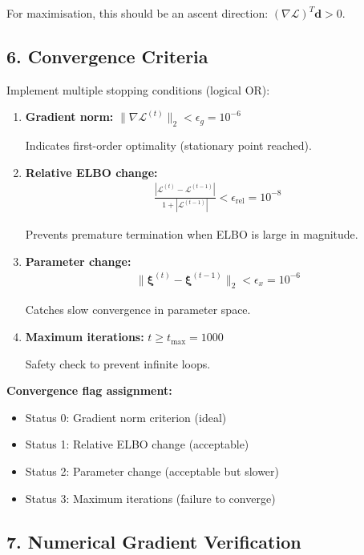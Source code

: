 \documentclass[11pt]{article}
\begin{document}
For maximisation, this should be an ascent direction: $(\nabla \mathcal{L})^T \bm{d} > 0$.

\subsection*{6. Convergence Criteria}

Implement multiple stopping conditions (logical OR):

\begin{enumerate}
\item \textbf{Gradient norm:} $\|\nabla \mathcal{L}^{(t)}\|_2 < \epsilon_g = 10^{-6}$

Indicates first-order optimality (stationary point reached).

\item \textbf{Relative ELBO change:}
\begin{align}
\frac{|\mathcal{L}^{(t)} - \mathcal{L}^{(t-1)}|}{1 + |\mathcal{L}^{(t-1)}|} < \epsilon_{\text{rel}} = 10^{-8}
\end{align}

Prevents premature termination when ELBO is large in magnitude.

\item \textbf{Parameter change:}
\begin{align}
\|\bm{\xi}^{(t)} - \bm{\xi}^{(t-1)}\|_2 < \epsilon_x = 10^{-6}
\end{align}

Catches slow convergence in parameter space.

\item \textbf{Maximum iterations:} $t \geq t_{\max} = 1000$

Safety check to prevent infinite loops.
\end{enumerate}

\textbf{Convergence flag assignment:}
\begin{itemize}
\item Status 0: Gradient norm criterion (ideal)
\item Status 1: Relative ELBO change (acceptable)
\item Status 2: Parameter change (acceptable but slower)
\item Status 3: Maximum iterations (failure to converge)
\end{itemize}

\subsection*{7. Numerical Gradient Verification}
\end{document}
